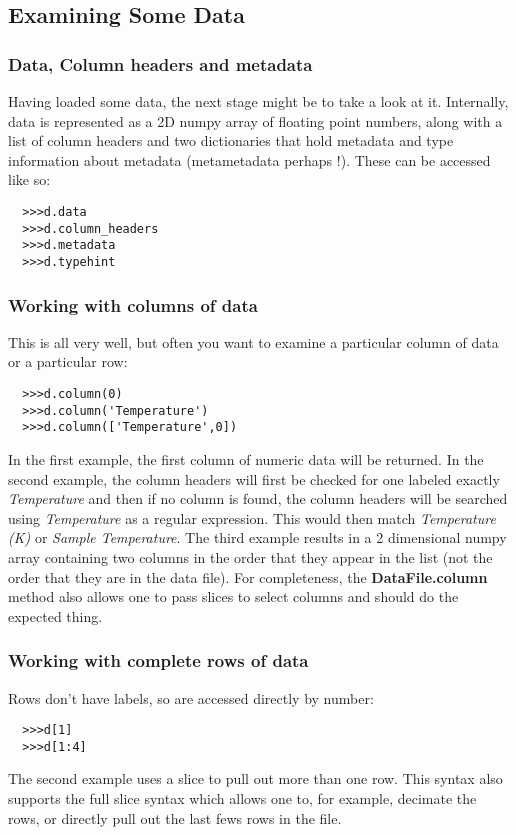 \documentclass[a4paper,11pt]{scrartcl}
\begin{document}
\subsection{Examining Some Data}
\subsubsection{Data, Column headers and metadata}
Having loaded some data, the next stage might be to take a look at it. Internally, data is represented as a 2D numpy array of floating point numbers, along with a list of column headers and two dictionaries that hold metadata and type information about metadata (metametadata perhaps !). These can be accessed like so:
\begin{verbatim}
  >>>d.data
  >>>d.column_headers
  >>>d.metadata
  >>>d.typehint
\end{verbatim}

\subsubsection{Working with columns of data}

This is all very well, but often you want to examine a particular column of data or a particular row:
\begin{verbatim}
  >>>d.column(0)
  >>>d.column('Temperature')
  >>>d.column(['Temperature',0])
\end{verbatim}
In the first example, the first column of numeric data will be returned. In the second example, the column headers will first be checked for one labeled exactly \textit{Temperature} and then if no column is found, the column headers will be searched using \textit{Temperature} as a regular expression. This would then match \textit{Temperature (K)} or \textit{Sample Temperature}.  The third example results in a 2 dimensional numpy array containing two columns in the order that they appear in the list (\ie not the order that they are in the data file). For completeness, the \textbf{DataFile.column} method also allows one to pass slices to select columns and should do the expected thing.

\subsubsection{Working with complete rows of data}

Rows don't have labels, so are accessed directly by number:
\begin{verbatim}
  >>>d[1]
  >>>d[1:4]
\end{verbatim}
The second example uses a slice to pull out more than one row. This syntax also supports the full slice syntax which allows one to, for example, decimate the rows, or directly pull out the last fews rows in the file.
\end{document}
